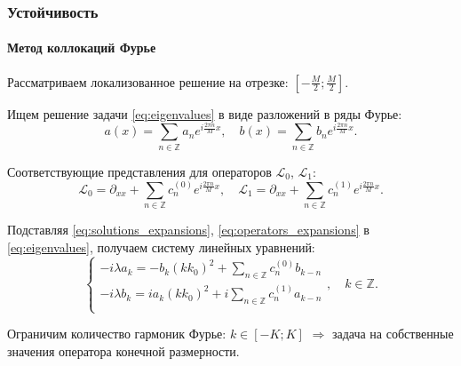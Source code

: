 \documentclass [10pt] {beamer}
\begin{document}
\begin{frame}
	\frametitle{Устойчивость}
	\framesubtitle{Метод коллокаций Фурье}
	
	Рассматриваем локализованное решение на отрезке: $[-\frac{M}{2}; \frac{M}{2}]$.
	
	Ищем решение задачи \eqref{eq:eigenvalues} в виде разложений в ряды Фурье:
	\begin{equation}
		a(x) = \sum \limits_{n \in \mathbb{Z}} a_n e^{i \frac{2 \pi n}{M} x}, \quad b(x) = \sum \limits_{n \in \mathbb{Z}} b_n e^{i \frac{2 \pi n}{M} x}.
		\label{eq:solutions_expansions}
	\end{equation}
	
	Соответствующие представления для операторов $\mathcal{L}_0$, $\mathcal{L}_1$:
	\begin{equation}
		\mathcal{L}_0 = \partial_{xx} + \sum \limits_{n \in \mathbb{Z}} c_n^{(0)} e^{i \frac{2 \pi n}{M} x}, \quad \mathcal{L}_1 = \partial_{xx} + \sum \limits_{n \in \mathbb{Z}} c_n^{(1)} e^{i \frac{2 \pi n}{M} x}.
		\label{eq:operators_expansions}
	\end{equation}
	
	Подставляя \eqref{eq:solutions_expansions}, \eqref{eq:operators_expansions} в \eqref{eq:eigenvalues}, получаем систему линейных уравнений:
	\begin{equation}
		\begin{cases}
			-i \lambda a_k = -b_k (k k_0)^2 + \sum \limits_{n \in \mathbb{Z}} c_n^{(0)} b_{k - n} \\
			-i \lambda b_k = i a_k (k k_0)^2 + i \sum \limits_{n \in \mathbb{Z}} c_n^{(1)} a_{k - n} \\
		\end{cases}, \quad k \in \mathbb{Z}.
		\label{eq:system}
	\end{equation}
	
	Ограничим количество гармоник Фурье: $k \in [-K; K]$ $\Rightarrow$ задача на собственные значения оператора конечной размерности.
\end{frame}

\end{document}
